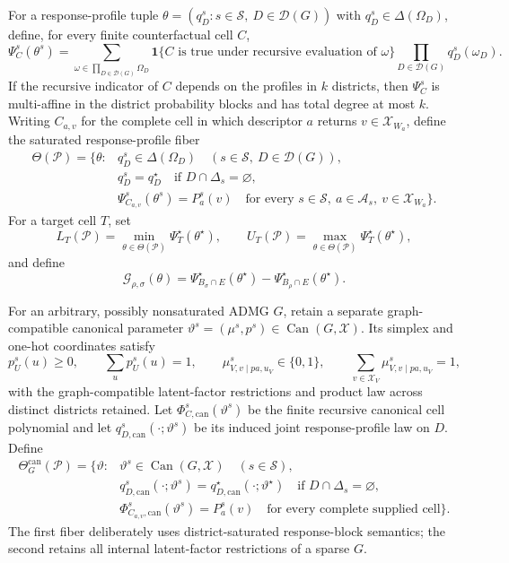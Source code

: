 For a response-profile tuple \(\theta=(q_D^s:s\in\mathcal S,\ D\in\mathcal D(G))\) with \(q_D^s\in\Delta(\Omega_D)\), define, for every finite counterfactual cell \(C\),
\[
\Psi_C^s(\theta^s)=
\sum_{\omega\in\prod_{D\in\mathcal D(G)}\Omega_D}
\mathbf 1\{C\text{ is true under recursive evaluation of }\omega\}
\prod_{D\in\mathcal D(G)}q_D^s(\omega_D).
\]
If the recursive indicator of \(C\) depends on the profiles in \(k\) districts, then \(\Psi_C^s\) is multi-affine in the district probability blocks and has total degree at most \(k\).  Writing \(C_{a,v}\) for the complete cell in which descriptor \(a\) returns \(v\in\mathcal X_{W_a}\), define the saturated response-profile fiber
\[
\begin{split}
\Theta(\mathcal P)=\bigl\{\theta:{}&q_D^s\in\Delta(\Omega_D)
\quad(s\in\mathcal S,\ D\in\mathcal D(G)),\\
&q_D^s=q_D^\star\quad\text{if }D\cap\Delta_s=\varnothing,\\
&\Psi_{C_{a,v}}^s(\theta^s)=P_a^s(v)
\quad\text{for every }s\in\mathcal S,\ a\in\mathcal A_s,
\ v\in\mathcal X_{W_a}\bigr\}.
\end{split}
\]
For a target cell \(T\), set
\[
L_T(\mathcal P)=\min_{\theta\in\Theta(\mathcal P)}\Psi_T^\star(\theta^\star),
\qquad
U_T(\mathcal P)=\max_{\theta\in\Theta(\mathcal P)}\Psi_T^\star(\theta^\star),
\]
and define
\[
\mathcal G_{\rho,\sigma}(\theta)
=\Psi_{B_\sigma\cap E}^\star(\theta^\star)
-\Psi_{B_\rho\cap E}^\star(\theta^\star).
\]

For an arbitrary, possibly nonsaturated ADMG \(G\), retain a separate graph-compatible canonical parameter \(\vartheta^s=(\mu^s,p^s)\in\operatorname{Can}(G,\mathcal X)\).  Its simplex and one-hot coordinates satisfy
\[
p_U^s(u)\geq0,\qquad \sum_up_U^s(u)=1,
\qquad \mu_{V,v\mid pa,u_V}^s\in\{0,1\},
\qquad \sum_{v\in\mathcal X_V}\mu_{V,v\mid pa,u_V}^s=1,
\]
with the graph-compatible latent-factor restrictions and product law across distinct districts retained.  Let \(\Phi_{C,\mathrm{can}}^s(\vartheta^s)\) be the finite recursive canonical cell polynomial and let \(q_{D,\mathrm{can}}^s(\cdot;\vartheta^s)\) be its induced joint response-profile law on \(D\).  Define
\[
\begin{split}
\Theta_G^{\mathrm{can}}(\mathcal P)=\bigl\{\vartheta:{}&
\vartheta^s\in\operatorname{Can}(G,\mathcal X)\quad(s\in\mathcal S),\\
&q_{D,\mathrm{can}}^s(\cdot;\vartheta^s)=q_{D,\mathrm{can}}^\star(\cdot;\vartheta^\star)
\quad\text{if }D\cap\Delta_s=\varnothing,\\
&\Phi_{C_{a,v},\mathrm{can}}^s(\vartheta^s)=P_a^s(v)
\quad\text{for every complete supplied cell}\bigr\}.
\end{split}
\]
The first fiber deliberately uses district-saturated response-block semantics; the second retains all internal latent-factor restrictions of a sparse \(G\).